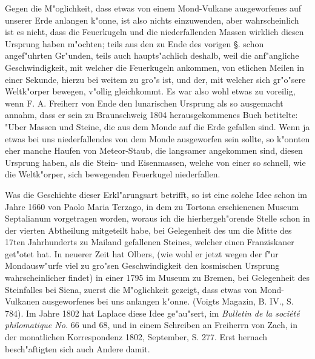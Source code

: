 \documentclass[a4paper, 11pt, oneside, polutonikogreek, german]{article}
\begin{document}
Gegen die M"oglichkeit, dass etwas von einem Mond-Vulkane ausgeworfenes auf unserer Erde anlangen k"onne, ist also nichts einzuwenden, aber wahrscheinlich ist es nicht, dass die Feuerkugeln und die niederfallenden Massen wirklich diesen Ursprung haben m"ochten; teils aus den zu Ende des vorigen §. schon angef"uhrten Gr"unden, teils auch haupts"achlich deshalb, weil die anf"angliche Geschwindigkeit, mit welcher die Feuerkugeln ankommen, von etlichen Meilen in einer Sekunde, hierzu bei weitem zu gro"s ist, und der, mit welcher sich gr"o"sere Weltk"orper bewegen, v"ollig gleichkommt. Es war also wohl etwas zu voreilig, wenn F. A. Freiherr von Ende den lunarischen Ursprung als so ausgemacht annahm, dass er sein zu Braunschweig 1804 herausgekommenes Buch betitelte: "Uber Massen und Steine, die aus dem Monde auf die Erde gefallen sind. Wenn ja etwas bei uns niederfallendes von dem Monde ausgeworfen sein sollte, so k"onnten eher manche Haufen von Meteor-Staub, die langsamer angekommen sind, diesen Ursprung haben, als die Stein- und Eisenmassen, welche von einer so schnell, wie die Weltk"orper, sich bewegenden Feuerkugel niederfallen.

Was die Geschichte dieser Erkl"arungsart betrifft, so ist eine solche Idee schon im Jahre 1660 von Paolo Maria Terzago, in dem zu Tortona erschienenen Museum Septalianum vorgetragen worden, woraus ich die hierhergeh"orende Stelle schon in der vierten Abtheilung mitgeteilt habe, bei Gelegenheit des um die Mitte des 17ten Jahrhunderts zu Mailand gefallenen Steines, welcher einen Franziskaner get"otet hat. In neuerer Zeit hat Olbers, (wie wohl er jetzt wegen der f"ur Mondausw"urfe viel zu gro"sen Geschwindigkeit den kosmischen Ursprung wahrscheinlicher findet) in einer 1795 im Museum zu Bremen, bei Gelegenheit des Steinfalles bei Siena, zuerst die M"oglichkeit gezeigt, dass etwas von Mond-Vulkanen ausgeworfenes bei uns anlangen k"onne. (Voigts Magazin, B. IV., S. 784). Im Jahre 1802 hat Laplace diese Idee ge"au"sert, im \emph{Bulletin de la société philomatique No.} 66 und 68, und in einem Schreiben an Freiherrn von Zach, in der monatlichen Korrespondenz 1802, September, S. 277. Erst hernach besch"aftigten sich auch Andere damit.
\subsection{}
\end{document}
